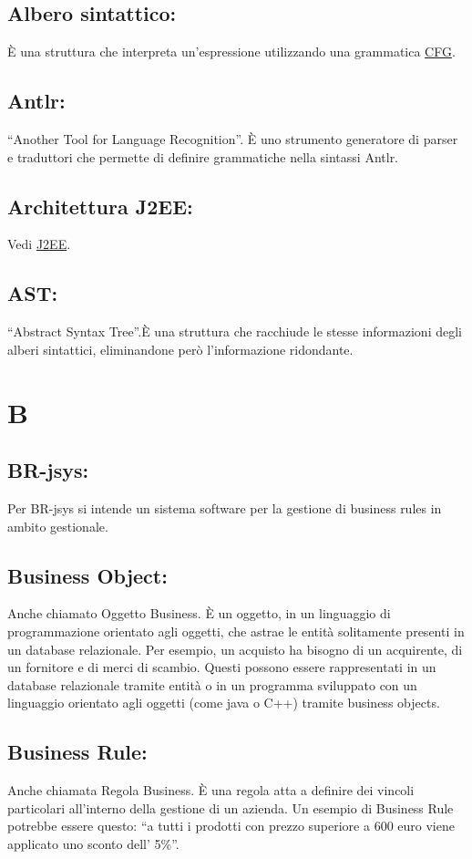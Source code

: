 \section{Albero sintattico:}
\`E una struttura che interpreta un'espressione utilizzando una grammatica \hyperlink{CFG}{CFG}.
\section{Antlr:}
``Another Tool for Language Recognition''. \`E uno strumento generatore di parser e traduttori che permette di definire grammatiche nella sintassi Antlr.
\section{Architettura J2EE:}
Vedi \hyperlink{J2EE}{J2EE}.
\section{AST:} 
``Abstract Syntax Tree''.\`E una struttura che racchiude le stesse informazioni degli alberi sintattici, eliminandone per\`o l'informazione ridondante.

\chapter{B}
\section{BR-jsys:}
Per BR-jsys si intende un sistema software per la gestione di business rules in ambito gestionale.
\hypertarget{Business Object}{}
\section{Business Object:}
Anche chiamato Oggetto Business. \`E un oggetto, in un linguaggio di programmazione orientato agli oggetti, che astrae le entit\`a solitamente presenti in un database relazionale.
Per esempio, un acquisto ha bisogno di un acquirente, di un fornitore e di merci di scambio. Questi possono essere rappresentati in un database relazionale tramite entit\`a o in un programma sviluppato con un linguaggio orientato agli oggetti (come java o C++) tramite business objects.
\hypertarget{Business Rule}{}
\section{Business Rule:}
Anche chiamata Regola Business. \`E una regola atta a definire dei vincoli particolari all'interno della gestione di un azienda. Un esempio di Business Rule potrebbe essere questo: ``a tutti i prodotti con prezzo superiore a 600 euro  viene applicato uno sconto dell' 5\%''.

